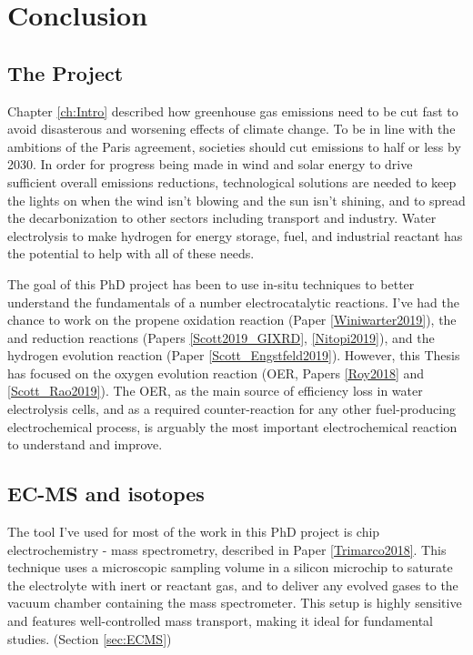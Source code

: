 
\section{Conclusion}\label{sec:conclusion}


\subsection*{The Project}

Chapter \ref{ch:Intro} described how greenhouse gas emissions need to be cut fast to avoid disasterous and worsening effects of climate change. To be in line with the ambitions of the Paris agreement, societies should cut emissions to half or less by 2030. In order for progress being made in wind and solar energy to drive sufficient overall emissions reductions, technological solutions are needed to keep the lights on when the wind isn't blowing and the sun isn't shining, and to spread the decarbonization to other sectors including transport and industry. Water electrolysis to make hydrogen for energy storage, fuel, and industrial reactant has the potential to help with all of these needs.

The goal of this PhD project has been to use in-situ techniques to better understand the fundamentals of a number electrocatalytic reactions. I've had the chance to work on the propene oxidation reaction (Paper \ref{Winiwarter2019}), the  and  reduction reactions (Papers \ref{Scott2019_GIXRD}, \ref{Nitopi2019}), and the hydrogen evolution reaction (Paper \ref{Scott_Engstfeld2019}). However, this Thesis has focused on the oxygen evolution reaction (OER, Papers \ref{Roy2018} and \ref{Scott_Rao2019}). The OER, as the main source of efficiency loss in water electrolysis cells, and as a required counter-reaction for any other fuel-producing electrochemical process, is arguably the most important electrochemical reaction to understand and improve.

\subsection*{EC-MS and isotopes}

The tool I've used for most of the work in this PhD project is chip electrochemistry - mass spectrometry, described in Paper \ref{Trimarco2018}. This technique uses a microscopic sampling volume in a silicon microchip to saturate the electrolyte with inert or reactant gas, and to deliver any evolved gases to the vacuum chamber containing the mass spectrometer. This setup is highly sensitive and features well-controlled mass transport, making it ideal for fundamental studies. (Section \ref{sec:ECMS})

